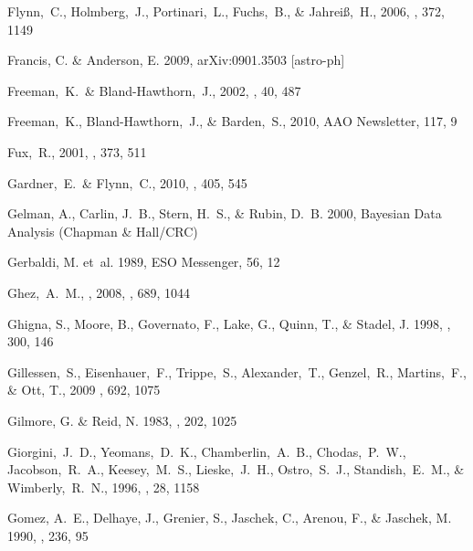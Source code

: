 \begin{thebibliography}{99}
  Flynn,~C., Holmberg,~J., Portinari,~L., Fuchs,~B., \& Jahrei{\ss},~H., 2006,
  \mnras, 372, 1149

{Francis}, C. \& {Anderson}, E. 2009, arXiv:0901.3503 [astro-ph]

  Freeman,~K.~\& Bland-Hawthorn,~J., 2002,
  \araa, 40, 487

  Freeman,~K., Bland-Hawthorn,~J., \& Barden,~S., 2010, 
  AAO Newsletter, 117, 9

  Fux,~R., 2001,
  \aap, 373, 511

  Gardner,~E.~\& Flynn,~C., 2010,
  \mnras, 405, 545

{Gelman}, A., {Carlin}, J.~B., {Stern}, H.~S., \& {Rubin}, D.~B. 2000,
  {Bayesian Data Analysis} ({Chapman \& Hall/CRC})

{Gerbaldi}, M. {et~al.} 1989, ESO Messenger, 56, 12

  Ghez,~A.~M., \etal, 2008,
  \apj, 689, 1044

{Ghigna}, S., {Moore}, B., {Governato}, F., {Lake}, G., {Quinn}, T., \&
  {Stadel}, J. 1998, \mnras, 300, 146

  Gillessen,~S., Eisenhauer,~F., Trippe,~S., Alexander,~T., Genzel,~R., Martins,~F., \& Ott, T., 2009
  \apj, 692, 1075

{Gilmore}, G. \& {Reid}, N. 1983, \mnras, 202, 1025

  Giorgini,~J.~D., Yeomans,~D.~K., Chamberlin,~A.~B., Chodas,~P.~W., Jacobson,~R.~A., Keesey,~M.~S., Lieske,~J.~H., Ostro,~S.~J., Standish,~E.~M., \& Wimberly,~R.~N., 1996, 
  \baas, 28, 1158

{Gomez}, A.~E., {Delhaye}, J., {Grenier}, S., {Jaschek}, C., {Arenou}, F., \&
  {Jaschek}, M. 1990, \aap, 236, 95


\end{thebibliography}
